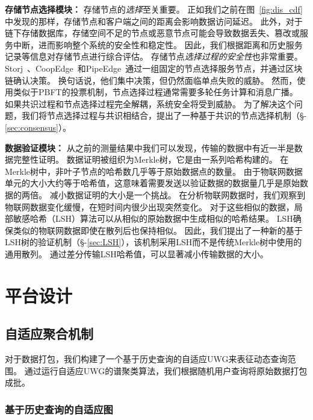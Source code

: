 \textbf{存储节点选择模块：}
存储节点的\textit{选择}至关重要。
正如我们之前在图~\autoref{fig:dis_cdf}中发现的那样，存储节点和客户端之间的距离会影响数据访问延迟。
此外，对于链下存储数据库，存储空间不足的节点或恶意节点可能会导致数据丢失、篡改或服务中断，进而影响整个系统的安全性和稳定性。
因此，我们根据距离和历史服务记录等信息对存储节点进行综合评估。
存储节点\textit{选择过程的安全性}也非常重要。
Storj~\cite{storj2018storj}、CoopEdge~\cite{yuan2021coopedge}和PipeEdge~\cite{yuan2023pipeedge}通过一组固定的节点选择服务节点，并通过区块链确认决策。
换句话说，他们集中决策，但仍然面临单点失败的威胁。
然而，使用类似于PBFT的投票机制，节点选择过程通常需要多轮任务计算和消息广播。
如果共识过程和节点选择过程完全解耦，系统安全将受到威胁。
为了解决这个问题，我们将节点选择过程与共识相结合，提出了一种基于共识的节点选择机制（§-\ref{sec:consensus}）。

\textbf{数据验证模块：}
从之前的测量结果中我们可以发现，传输的数据中有近一半是数据完整性证明。
数据证明被组织为Merkle树，它是由一系列哈希构建的。
在Merkle树中，非叶子节点的哈希数几乎等于原始数据点的数量。
由于物联网数据单元的大小大约等于哈希值，这意味着需要发送以验证数据的数据量几乎是原始数据的两倍。
减小数据证明的大小是一个挑战。
在分析物联网数据时，我们观察到物联网数据变化缓慢，在短时间内很少出现突然变化。
对于这些相似的数据，局部敏感哈希（LSH）算法可以从相似的原始数据中生成相似的哈希结果。
LSH确保类似的物联网数据即使在散列后也保持相似。
因此，我们提出了一种新的基于LSH树的验证机制（§-\ref{sec:LSH}），该机制采用LSH而不是传统Merkle树中使用的通用散列。
通过差分传输LSH哈希值，可以显著减小传输数据的大小。

\chapter{平台设计}

\section{自适应聚合机制}
\label{sec:packaging}

对于数据打包，我们构建了一个基于历史查询的自适应UWG来表征动态查询范围。
通过运行自适应UWG的谱聚类算法，我们根据随机用户查询将原始数据打包成批。

\subsection{基于历史查询的自适应图}
\label{sec:UWG}

